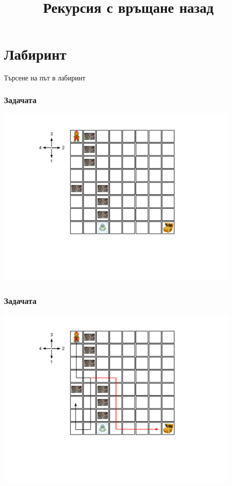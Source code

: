 \documentclass{beamer}
\begin{document}
\title[Увод в програмирането]{Рекурсия с връщане назад} 
\frame{\titlepage} 


\section{Лабиринт}


\begin{frame}
\centerline{Търсене на път в лабиринт}
\end{frame}



\begin{frame}[fragile]
\frametitle{Задачата}
\includegraphics[width=12cm]{images/lab_00}
\end{frame}

\begin{frame}[fragile]
\frametitle{Задачата}
\includegraphics[width=12cm]{images/lab_sol}
\end{frame}
\end{document}
